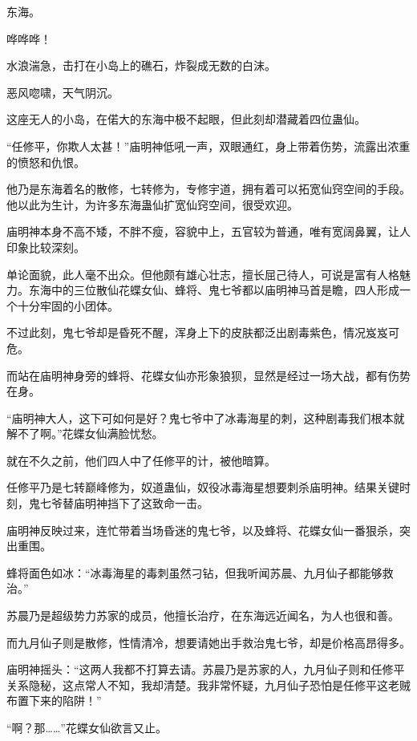 
\begin{this_body}



东海。

哗哗哗！

水浪湍急，击打在小岛上的礁石，炸裂成无数的白沫。

恶风唿啸，天气阴沉。

这座无人的小岛，在偌大的东海中极不起眼，但此刻却潜藏着四位蛊仙。

“任修平，你欺人太甚！”庙明神低吼一声，双眼通红，身上带着伤势，流露出浓重的愤怒和仇恨。

他乃是东海着名的散修，七转修为，专修宇道，拥有着可以拓宽仙窍空间的手段。他以此为生计，为许多东海蛊仙扩宽仙窍空间，很受欢迎。

庙明神本身不高不矮，不胖不瘦，容貌中上，五官较为普通，唯有宽阔鼻翼，让人印象比较深刻。

单论面貌，此人毫不出众。但他颇有雄心壮志，擅长屈己待人，可说是富有人格魅力。东海中的三位散仙花蝶女仙、蜂将、鬼七爷都以庙明神马首是瞻，四人形成一个十分牢固的小团体。

不过此刻，鬼七爷却是昏死不醒，浑身上下的皮肤都泛出剧毒紫色，情况岌岌可危。

而站在庙明神身旁的蜂将、花蝶女仙亦形象狼狈，显然是经过一场大战，都有伤势在身。

“庙明神大人，这下可如何是好？鬼七爷中了冰毒海星的刺，这种剧毒我们根本就解不了啊。”花蝶女仙满脸忧愁。

就在不久之前，他们四人中了任修平的计，被他暗算。

任修平乃是七转巅峰修为，奴道蛊仙，奴役冰毒海星想要刺杀庙明神。结果关键时刻，鬼七爷替庙明神挡下了这致命一击。

庙明神反映过来，连忙带着当场昏迷的鬼七爷，以及蜂将、花蝶女仙一番狠杀，突出重围。

蜂将面色如冰：“冰毒海星的毒刺虽然刁钻，但我听闻苏晨、九月仙子都能够救治。”

苏晨乃是超级势力苏家的成员，他擅长治疗，在东海远近闻名，为人也很和善。

而九月仙子则是散修，性情清冷，想要请她出手救治鬼七爷，却是价格高昂得多。

庙明神摇头：“这两人我都不打算去请。苏晨乃是苏家的人，九月仙子则和任修平关系隐秘，这点常人不知，我却清楚。我非常怀疑，九月仙子恐怕是任修平这老贼布置下来的陷阱！”

“啊？那……”花蝶女仙欲言又止。


\end{this_body}
